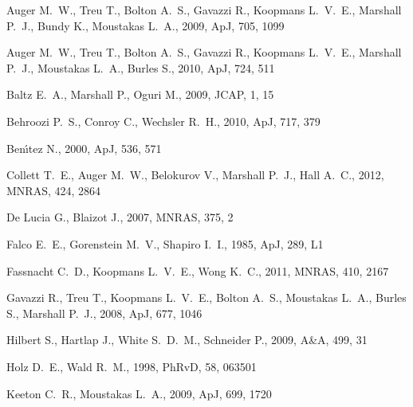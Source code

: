 \begin{thebibliography}{99}



Auger M.~W., Treu T., Bolton A.~S., Gavazzi R., Koopmans L.~V.~E., Marshall 
P.~J., Bundy K., Moustakas L.~A., 2009, ApJ, 705, 1099 


Auger M.~W., Treu T., Bolton A.~S., Gavazzi R., Koopmans L.~V.~E., Marshall 
P.~J., Moustakas L.~A., Burles S., 2010, ApJ, 724, 511 


 Baltz E.~A., Marshall P., Oguri M., 2009, JCAP, 1, 15 


 Behroozi P.~S., Conroy C., Wechsler R.~H., 2010, ApJ, 717, 379 


 Ben{\'{\i}}tez N., 2000, ApJ, 536, 571 


 Collett T.~E., Auger M.~W., Belokurov V., 
Marshall P.~J., Hall A.~C., 2012, MNRAS, 424, 2864 


 De Lucia G., Blaizot J., 2007, MNRAS, 375, 2 


 Falco E.~E., Gorenstein M.~V., Shapiro I.~I., 1985, ApJ, 289, L1 


 Fassnacht C.~D., Koopmans L.~V.~E., Wong K.~C., 2011, MNRAS, 410, 2167 


 Gavazzi R., Treu T., Koopmans L.~V.~E., 
Bolton A.~S., Moustakas L.~A., Burles S., Marshall P.~J., 2008, ApJ, 677, 
1046 


 Hilbert S., Hartlap J., White S.~D.~M., Schneider P., 2009, A\&A, 499, 31 


 Holz D.~E., Wald R.~M., 1998, PhRvD, 58, 063501 


 Keeton C.~R., Moustakas L.~A., 2009, ApJ, 699, 1720 



\end{thebibliography}
